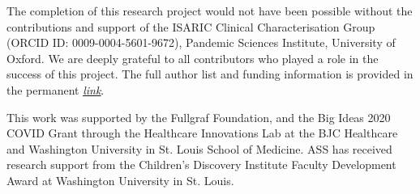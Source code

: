 \begin{acks}
The completion of this research project would not have been possible without the contributions and support of the ISARIC Clinical Characterisation Group (ORCID ID: 0009-0004-5601-9672), Pandemic Sciences Institute, University of Oxford. We are deeply grateful to all contributors who played a role in the success of this project. The full author list and funding information is provided in the permanent \href{https://docs.google.com/document/d/17pWtnRI251dDsaQPAb5SMFjHQgEkJ-Hi/edit?usp=sharing&ouid=114308118763539217087&rtpof=true&sd=true}{\underline{\textit{link}}}. 

    This work was supported by the Fullgraf Foundation, and the Big Ideas 2020 COVID Grant through the Healthcare Innovations Lab at the BJC Healthcare and Washington University in St. Louis School of Medicine. ASS has received research support from the Children’s Discovery Institute Faculty Development Award at Washington University in St. Louis.
\end{acks}